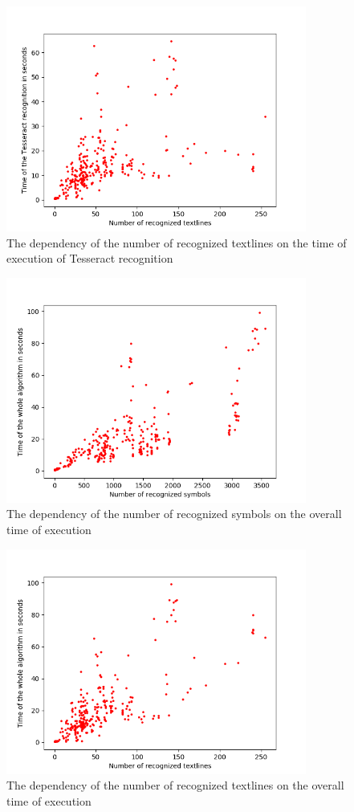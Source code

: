 \begin{figure}
\centering
\includegraphics[height=20em]{img/results/textlinesTimeTesseract.png}
\caption{The dependency of the number of recognized textlines on the time of execution of Tesseract recognition}
\label{fig:textlinesTimeTess}
\end{figure}

\begin{figure}
\centering
\includegraphics[height=20em]{img/results/symbolsTimeAll.png}
\caption{The dependency of the number of recognized symbols on the overall time of execution}
\label{fig:symbolsTime}
\end{figure}

\begin{figure}
\centering
\includegraphics[height=20em]{img/results/textlinesTimeAll.png}
\caption{The dependency of the number of recognized textlines on the overall time of execution}
\label{fig:textlinesTime}
\end{figure}


